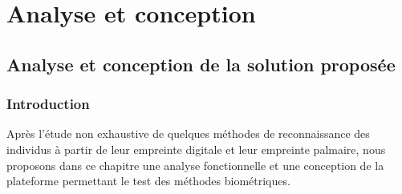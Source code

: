 \part{Analyse et conception}
\chapter{Analyse et conception de la solution proposée}
\section{Introduction}
Après l’étude non exhaustive de quelques méthodes de reconnaissance des individus à partir de leur empreinte digitale et leur empreinte palmaire, nous proposons dans ce chapitre une analyse fonctionnelle et une conception de la plateforme permettant le test des méthodes biométriques.

